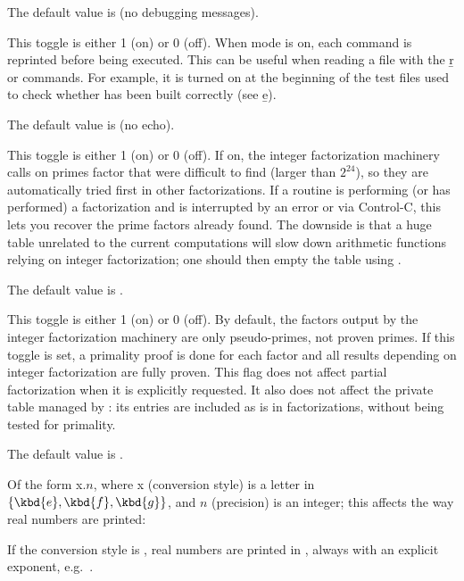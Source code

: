 {The default value is  (no debugging messages).

\label{se:def,echo}
This toggle is either 1 (on) or 0 (off). When 
mode is on, each command is reprinted before being executed. This can be
useful when reading a file with the \b{r} or  commands. For
example, it is turned on at the beginning of the test files used to check
whether  has been built correctly (see \b{e}).

The default value is  (no echo).

\label{se:def,factor_add_primes}
This toggle is either 1 (on) or 0 (off). If on,
the integer factorization machinery calls  on primes
factor that were difficult to find (larger than $2^24$), so they are
automatically tried first in other factorizations. If a routine is performing
(or has performed) a factorization and is interrupted by an error or via
Control-C, this lets you recover the prime factors already found. The
downside is that a huge  table unrelated to the current
computations will slow down arithmetic functions relying on integer
factorization; one should then empty the table using .

The default value is .

\label{se:def,factor_proven}
This toggle is either 1 (on) or 0 (off). By
default, the factors output by the integer factorization machinery are
only pseudo-primes, not proven primes. If this toggle is
set, a primality proof is done for each factor and all results depending on
integer factorization are fully proven. This flag does not affect partial
factorization when it is explicitly requested. It also does not affect the
private table managed by : its entries are included as is in
factorizations, without being tested for primality.

The default value is .

\label{se:def,format}
Of the form x$.n$, where x (conversion style)
is a letter in $\{\kbd{e},\kbd{f},\kbd{g}\}$, and $n$ (precision) is an
integer; this affects the way real numbers are printed:

\item If the conversion style is , real numbers are printed in
, always with an explicit exponent,
e.g.~.

}
